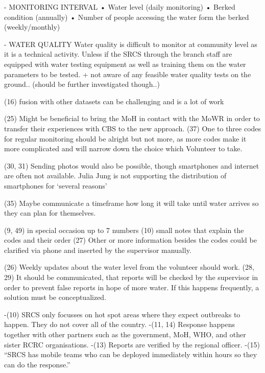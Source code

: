- MONITORING INTERVAL
•	Water level (daily monitoring)
•	Berked condition (annually)
•	Number of people accessing the water form the berked (weekly/monthly)

- WATER QUALITY
Water quality is difficult to monitor at community level as it is a technical activity. Unless if the SRCS through the branch staff are equipped with water testing equipment as well as training them on the water parameters to be tested.
+ not aware of any feasible water quality tests on the ground.. (should be further investigated though..)



(16) fusion with other datasets can be challenging and is a lot of work


(25) Might be beneficial to bring the MoH in contact with the MoWR in order to transfer their experiences with CBS to the new approach.
(37) One to three codes for regular monitoring should be alright but not more, as more codes make it more complicated and will narrow down the choice which Volunteer to take. 

(30, 31) Sending photos would also be possible, though smartphones and internet are often not available. Julia Jung is not supporting the distribution of smartphones for ‘several reasons’

(35) Maybe communicate a timeframe how long it will take until water arrives so they can plan for themselves.

(9, 49) in special occasion up to 7 numbers
(10) small notes that explain the codes and their order
(27) Other or more information besides the codes could be clarified via phone and inserted by the supervisor manually.

(26) Weekly updates about the water level from the volunteer should work.
(28, 29) It should be communicated, that reports will be checked by the supervisor in order to prevent false reports in hope of more water. If this happens frequently, a solution must be conceptualized.

-(10) SRCS only focusses on hot spot areas where they expect outbreaks to happen. They do not cover all of the country.
-(11, 14) Response happens together with other partners such as the government, MoH, WHO, and other sister RCRC organisations.
-(13) Reports are verified by the regional officer.
-(15) “SRCS has mobile teams who can be deployed immediately within hours so they can do the response.”

